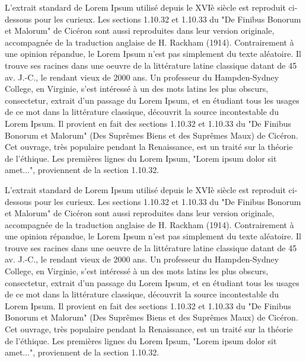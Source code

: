 \documentclass{book}
\begin{document}
L'extrait standard de Lorem Ipsum utilisé depuis le XVIè siècle est reproduit ci-dessous pour les curieux. Les sections 1.10.32 et 1.10.33 du "De Finibus Bonorum et Malorum" de Cicéron sont aussi reproduites dans leur version originale, accompagnée de la traduction anglaise de H. Rackham (1914).
Contrairement à une opinion répandue, le Lorem Ipsum n'est pas simplement du texte aléatoire. Il trouve ses racines dans une oeuvre de la littérature latine classique datant de 45 av. J.-C., le rendant vieux de 2000 ans. Un professeur du Hampden-Sydney College, en Virginie, s'est intéressé à un des mots latins les plus obscurs, consectetur, extrait d'un passage du Lorem Ipsum, et en étudiant tous les usages de ce mot dans la littérature classique, découvrit la source incontestable du Lorem Ipsum. Il provient en fait des sections 1.10.32 et 1.10.33 du "De Finibus Bonorum et Malorum" (Des Suprêmes Biens et des Suprêmes Maux) de Cicéron. Cet ouvrage, très populaire pendant la Renaissance, est un traité sur la théorie de l'éthique. Les premières lignes du Lorem Ipsum, "Lorem ipsum dolor sit amet...", proviennent de la section 1.10.32.

L'extrait standard de Lorem Ipsum utilisé depuis le XVIè siècle est reproduit ci-dessous pour les curieux. Les sections 1.10.32 et 1.10.33 du "De Finibus Bonorum et Malorum" de Cicéron sont aussi reproduites dans leur version originale, accompagnée de la traduction anglaise de H. Rackham (1914).
Contrairement à une opinion répandue, le Lorem Ipsum n'est pas simplement du texte aléatoire. Il trouve ses racines dans une oeuvre de la littérature latine classique datant de 45 av. J.-C., le rendant vieux de 2000 ans. Un professeur du Hampden-Sydney College, en Virginie, s'est intéressé à un des mots latins les plus obscurs, consectetur, extrait d'un passage du Lorem Ipsum, et en étudiant tous les usages de ce mot dans la littérature classique, découvrit la source incontestable du Lorem Ipsum. Il provient en fait des sections 1.10.32 et 1.10.33 du "De Finibus Bonorum et Malorum" (Des Suprêmes Biens et des Suprêmes Maux) de Cicéron. Cet ouvrage, très populaire pendant la Renaissance, est un traité sur la théorie de l'éthique. Les premières lignes du Lorem Ipsum, "Lorem ipsum dolor sit amet...", proviennent de la section 1.10.32.
\end{document}
